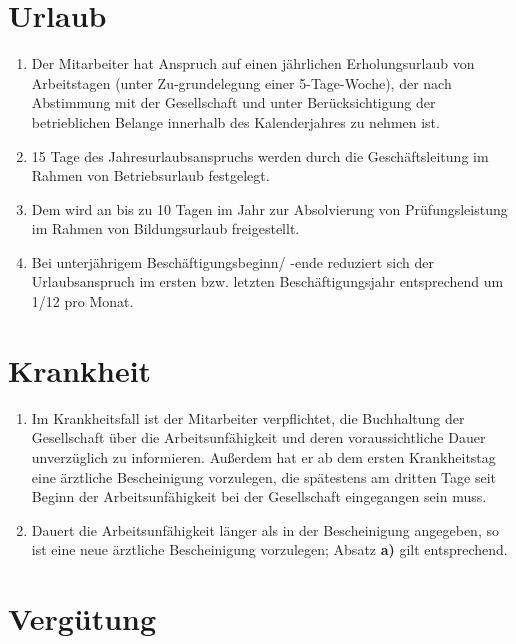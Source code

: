 \documentclass[twoside,a4paper]{scrreprt}
\begin{document}
\section{Urlaub}
    
    \centerline{ }
    \begin{enumerate}[label=(\alph*)]
    	\item Der Mitarbeiter hat Anspruch auf einen jährlichen Erholungsurlaub von \urlaub \white Arbeitstagen (unter Zu-grundelegung einer 5-Tage-Woche), der nach Abstimmung mit der Gesellschaft und unter Berücksichtigung der betrieblichen Belange innerhalb des Kalenderjahres zu nehmen ist.
    	\item 15 Tage des Jahresurlaubsanspruchs werden durch die Geschäftsleitung im Rahmen von Betriebsurlaub festgelegt.
    	\item Dem wird an bis zu 10 Tagen im Jahr zur Absolvierung von Prüfungsleistung im Rahmen von Bildungsurlaub freigestellt.
    	\item Bei unterjährigem Beschäftigungsbeginn/ -ende reduziert sich der Urlaubsanspruch im ersten bzw. letzten Beschäftigungsjahr entsprechend um 1/12 pro Monat.
    \end{enumerate}

\section{Krankheit}
    
    \centerline{ }
    \begin{enumerate}[label=(\alph*)]
    	\item Im Krankheitsfall ist der Mitarbeiter verpflichtet, die Buchhaltung der Gesellschaft über die Arbeitsunfähigkeit und deren voraussichtliche Dauer unverzüglich zu informieren. Außerdem hat er ab dem ersten Krankheitstag eine ärztliche Bescheinigung vorzulegen, die spätestens am dritten Tage seit Beginn der Arbeitsunfähigkeit bei der Gesellschaft eingegangen sein muss.
    	\item Dauert die Arbeitsunfähigkeit länger als in der Bescheinigung angegeben, so ist eine neue ärztliche Bescheinigung vorzulegen; Absatz \textbf{a)} gilt entsprechend.
    \end{enumerate}

\newpage    
\section{Vergütung}
\end{document}
